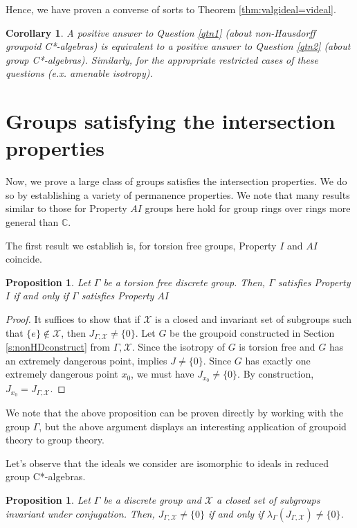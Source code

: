 \documentclass[a4paper, 12pt]{amsart}
\newtheorem{cor}[thm]{Corollary}
\newtheorem{prp}[thm]{Proposition}
\theoremstyle{definition}
\theoremstyle{remark}
\numberwithin{equation}{section}
\begin{document}
Hence, we have proven a converse of sorts to Theorem \ref{thm:valgideal=videal}.

\begin{cor}
\label{cor:equalqs}
    A positive answer to Question \ref{qtn1} (about non-Hausdorff groupoid C*-algebras) is equivalent to a positive answer to Question \ref{qtn2} (about group C*-algebras). Similarly, for the appropriate restricted cases of these questions (e.x. amenable isotropy).
\end{cor}


\section{Groups satisfying the intersection properties}
\label{s:groupswint}
Now, we prove a large class of groups satisfies the intersection properties. We do so by establishing a variety of permanence properties. We note that many results similar to those for Property $AI$ groups here hold for group rings over rings more general than $\mathbb{C}$.

The first result we establish is, for torsion free groups, Property $I$ and $AI$ coincide.

\begin{prp}
    Let $\Gamma$ be a torsion free discrete group. Then, $\Gamma$ satisfies Property $I$ if and only if $\Gamma$ satisfies Property $AI$
\end{prp}

\begin{proof}
    It suffices to show that if $\mathcal{X}$ is a closed and invariant set of subgroups such that $\{e\}\notin \mathcal{X}$, then $J_{\Gamma,\mathcal{X}}\neq \{0\}$.  Let $G$ be the groupoid constructed in Section \ref{s:nonHDconstruct} from $\Gamma,\mathcal{X}$. Since the isotropy of $G$ is torsion free and $G$ has an extremely dangerous point, \cite[Proposition~1.8]{NS23} implies $J\neq \{0\}$. Since $G$ has exactly one extremely dangerous point $x_{0}$, we must have $J_{x_{0}}\neq \{0\}$. By construction, $J_{x_{0}} = J_{\Gamma,\mathcal{X}}$.
\end{proof}

We note that the above proposition can be proven directly by working with the group $\Gamma$, but the above argument displays an interesting application of groupoid theory to group theory.

Let's observe that the ideals we consider are isomorphic to ideals in reduced group C*-algebras.
\begin{prp}
\label{prp:gideal=rgideal}
    Let $\Gamma$ be a discrete group and $\mathcal{X}$ a closed set of subgroups invariant under conjugation. Then, $J_{\Gamma,\mathcal{X}}\neq\{0\}$ if and only if $\lambda_{\Gamma}(J_{\Gamma,\mathcal{X}})\neq\{0\}$.
\end{prp}
\end{document}
